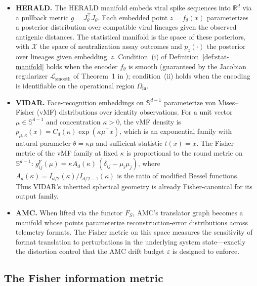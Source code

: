 \documentclass[11pt]{article}
\newcommand{\RR}{\mathbb{R}}
\newcommand{\gF}{g^{\mathrm{F}}}
\theoremstyle{remark}
\begin{document}
\begin{itemize}[leftmargin=*]
  \item \textbf{HERALD.}  The HERALD manifold embeds viral spike sequences into
  $\RR^d$ via a pullback metric $g = J_\theta^\top J_\theta$.  Each embedded
  point $z = f_\theta(x)$ parameterizes a posterior distribution over compatible
  viral lineages given the observed antigenic distances.  The statistical manifold
  is the space of these posteriors, with $\mathcal{X}$ the space of
  neutralization assay outcomes and $p_z(\cdot)$ the posterior over lineages
  given embedding~$z$.  Condition~(i) of Definition~\ref{def:stat-manifold}
  holds when the encoder $f_\theta$ is smooth (guaranteed by the Jacobian
  regularizer $\mathcal{L}_{\mathrm{smooth}}$ of Theorem~1 in
  \cite{davis2025manifold}); condition~(ii) holds when the encoding is
  identifiable on the operational region $\Omega_{\mathrm{in}}$.

  \item \textbf{VIDAR.}  Face-recognition embeddings on $\mathbb{S}^{d-1}$
  parameterize von Mises--Fisher (vMF) distributions over identity observations.
  For a unit vector $\mu \in \mathbb{S}^{d-1}$ and concentration $\kappa > 0$,
  the vMF density is
  $p_{\mu,\kappa}(x) = C_d(\kappa) \exp(\kappa \mu^\top x)$,
  which is an exponential family with natural parameter
  $\theta = \kappa\mu$ and sufficient statistic $t(x) = x$.
  The Fisher metric of the vMF family at fixed $\kappa$ is proportional to the
  round metric on $\mathbb{S}^{d-1}$:
  $\gF_{ij}(\mu) = \kappa A_d(\kappa)\,(\delta_{ij} - \mu_i\mu_j)$,
  where $A_d(\kappa) = I_{d/2}(\kappa)/I_{d/2-1}(\kappa)$ is the ratio of
  modified Bessel functions.  Thus VIDAR's inherited spherical geometry is
  already Fisher-canonical for its output family.

  \item \textbf{AMC.}  When lifted via the functor $F_S$, AMC's translator graph
  becomes a manifold whose points parameterize reconstruction-error distributions
  across telemetry formats.  The Fisher metric on this space measures the
  sensitivity of format translation to perturbations in the underlying system
  state---exactly the distortion control that the AMC drift budget $\varepsilon$
  is designed to enforce.
\end{itemize}

\subsection{The Fisher information metric}
\end{document}
